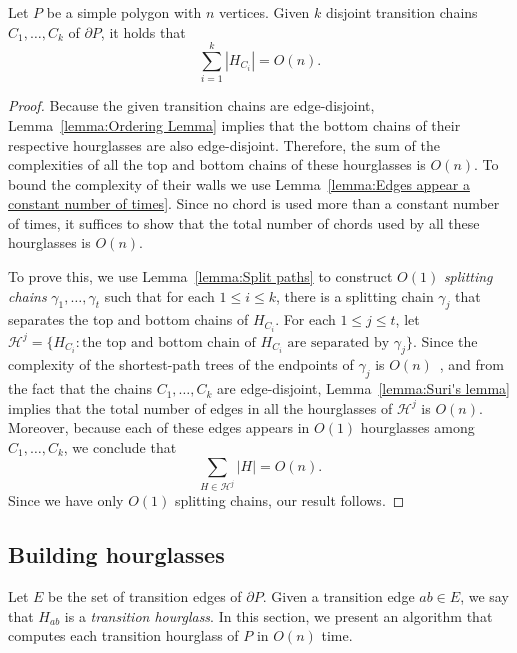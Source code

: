\documentclass[a4paper,UKenglish]{lipics}
\begin{document}
\begin{lemma}\label{lemma:Bounding complexity of hourglasses}
Let $P$ be a simple polygon with $n$ vertices.
Given $k$ disjoint transition chains $C_1, \ldots, C_k$  of $\partial P$, it holds that  $$\sum_{i=1}^k |H_{C_i}| = O(n).$$
\end{lemma}
\begin{proof}

Because the given transition chains are edge-disjoint, Lemma~\ref{lemma:Ordering Lemma} implies that the bottom chains of their respective hourglasses are also edge-disjoint. Therefore, the sum of the complexities of all the top and bottom chains of these hourglasses is $O(n)$. 
To bound the complexity of their walls we use
Lemma~\ref{lemma:Edges appear a constant number of times}. Since  no chord is used more than a constant number of times, it suffices to show that the total number of chords used by all these hourglasses is $O(n)$.

To prove this, we use Lemma~\ref{lemma:Split paths} to construct $O(1)$ \emph{splitting chains} $\gamma_1, \ldots, \gamma_t$ such that for each $1\leq i\leq k$, there is a splitting chain $\gamma_j$ that separates the top and bottom chains of $H_{C_i}$.
For each $1\leq j\leq t$, let $\mathcal H^j = \{H_{C_i} : \text{the top and bottom chain of $H_{C_i}$ are separated by }\gamma_j\}$.
Since the complexity of the shortest-path trees of the endpoints of $\gamma_j$ is $O(n)$~\cite{guibasShortestPathTree},
and from the fact that the chains $C_1, \ldots, C_k$ are edge-disjoint,  Lemma~\ref{lemma:Suri's lemma} implies that
the total number of edges in all the hourglasses of $\mathcal H^j$ is $O(n)$. Moreover, because each of these edges appears in $O(1)$ hourglasses among $C_1, \ldots, C_k$, we conclude that 
$$\sum_{H \in \mathcal H^j } |H| = O(n).$$
Since we have only $O(1)$ splitting chains, our result follows.
\end{proof}

\subsection{Building hourglasses}

Let $E$ be the set of transition edges of $\partial P$.
Given a transition edge $ab\in E$, we say that $H_{ab}$ is a \emph{transition hourglass}.
In this section, we present an algorithm that computes each transition hourglass of $P$ in $O(n)$ time.
\end{document}
